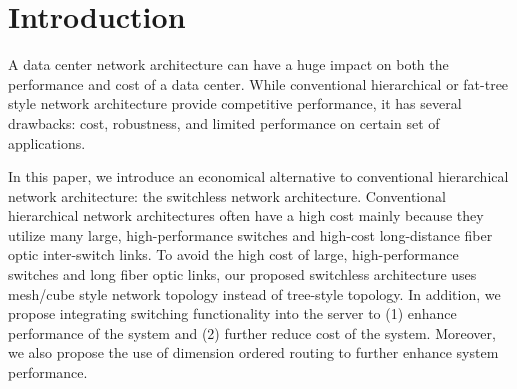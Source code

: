 \vspace{-0.1in}
\section{Introduction}
\label{sec:intro}
A data center network architecture can have a huge impact on both the performance and cost of a data center. While conventional hierarchical or fat-tree style network architecture provide competitive performance, it has several drawbacks: cost, robustness, and limited performance on certain set of applications. 

In this paper, we introduce an economical alternative to conventional hierarchical network architecture: the switchless network architecture. Conventional hierarchical network architectures often have a high cost mainly because they utilize many large, high-performance switches and high-cost long-distance fiber optic inter-switch links. To avoid the high cost of large, high-performance switches and long fiber optic links, our proposed switchless architecture uses mesh/cube style network topology instead of tree-style topology. In addition, we propose integrating switching functionality into the server to (1) enhance performance of the system and (2) further reduce cost of the system. Moreover, we also propose the use of dimension ordered routing to further enhance system performance.
